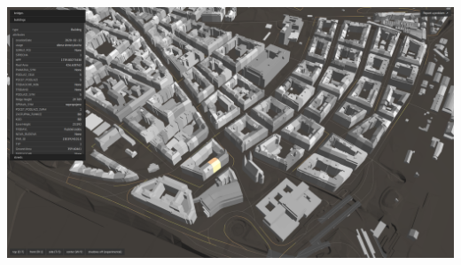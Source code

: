 \documentclass[czech,xcolor={table}]{beamer}
\begin{document}
	\begin{frame}
		\frametitle{}
		\begin{center}
			\includegraphics[width=1\textwidth]{imgs/metacity.png}
		\end{center}
	\end{frame}
\end{document}

